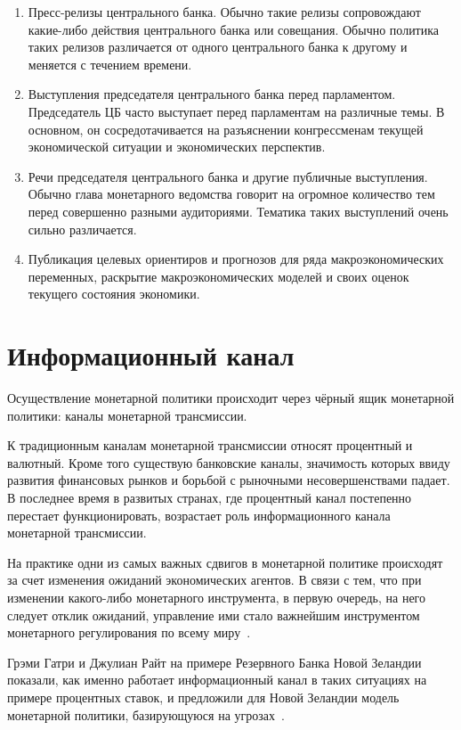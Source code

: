 \documentclass[14pt,a4paper, oneside]{extreport}
\begin{document}
\begin{enumerate}
\item Пресс-релизы центрального банка. Обычно такие релизы сопровождают какие-либо действия центрального банка или совещания.  Обычно политика таких релизов различается от одного центрального банка к другому и меняется с течением времени.

\item Выступления председателя центрального банка перед парламентом. Председатель ЦБ часто выступает перед парламентам на различные темы. В основном, он сосредотачивается на разъяснении конгрессменам текущей экономической ситуации и экономических перспектив.


\item Речи председателя центрального банка и другие публичные выступления. Обычно глава монетарного ведомства говорит на огромное количество тем перед совершенно разными аудиториями. Тематика таких выступлений очень сильно различается. 

\item Публикация целевых ориентиров и прогнозов для ряда макроэкономических переменных, раскрытие макроэкономических моделей и своих оценок текущего состояния экономики.
\end{enumerate}



\section{Информационный канал}

Осуществление монетарной политики происходит через чёрный ящик монетарной политики: каналы монетарной трансмиссии.

К традиционным каналам монетарной трансмиссии относят процентный и валютный. Кроме того существую банковские каналы, значимость которых ввиду развития финансовых рынков и борьбой с рыночными несовершенствами падает. В последнее время в развитых странах, где процентный канал постепенно перестает функционировать, возрастает роль информационного канала монетарной трансмиссии.

На практике одни из самых важных сдвигов в монетарной политике происходят за счет изменения ожиданий экономических агентов. В связи с тем, что при изменении какого-либо монетарного инструмента, в первую очередь, на него следует отклик ожиданий, управление ими стало важнейшим инструментом монетарного регулирования по всему миру~\cite{boivin2010has}.

Грэми Гатри и Джулиан Райт на примере Резервного Банка Новой Зеландии показали, как именно работает информационный канал в таких ситуациях на примере процентных ставок, и предложили для Новой Зеландии модель монетарной политики, базирующуюся на угрозах~\cite{guthrie2000open}.
\end{document}
